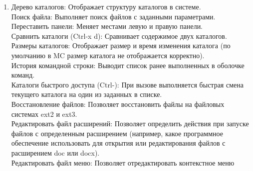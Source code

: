 \documentclass[
  english,
  russian,
  12pt,
  a4paper,
  DIV=11,
  numbers=noendperiod]{scrreprt}
\begin{document}
\begin{enumerate}
  Права доступа (Ctrl-x c): Позволяет указать (или изменить) права
  доступа к одному или нескольким файлам или каталогам.\\
  Жёсткая ссылка (Ctrl-x l): Создает жёсткую ссылку на текущий (или
  выделенный) файл.\\
  Символическая ссылка (Ctrl-x s): Создает символическую ссылку на
  текущий (или выделенный) файл.\\
  Владелец/группа (Ctrl-x o): Позволяет задать (или изменить) владельца
  и имя группы для одного или нескольких файлов или каталогов.\\
  Права (расширенные): Позволяет изменить расширенные права доступа и
  владение для одного или нескольких файлов или каталогов.\\
  Переименование (F6): Позволяет переименовать (или переместить) один
  или несколько файлов или каталогов.\\
  Создание каталога (F7): Позволяет создать новый каталог.\\
  Удалить (F8): Позволяет удалить один или несколько файлов или
  каталогов.\\
  Выход (F10): Завершает работу Midnight Commander (mc).
\item
  Дерево каталогов: Отображает структуру каталогов в системе.\\
  Поиск файла: Выполняет поиск файлов с заданными параметрами.\\
  Переставить панели: Меняет местами левую и правую панели.\\
  Сравнить каталоги (Ctrl-x d): Сравнивает содержимое двух каталогов.\\
  Размеры каталогов: Отображает размер и время изменения каталога (по
  умолчанию в MC размер каталога не отображается корректно).\\
  История командной строки: Выводит список ранее выполненных в оболочке
  команд.\\
  Каталоги быстрого доступа (Ctrl-): При вызове выполняется быстрая
  смена текущего каталога на один из заданных в списке.\\
  Восстановление файлов: Позволяет восстановить файлы на файловых
  системах ext2 и ext3.\\
  Редактировать файл расширений: Позволяет определить действия при
  запуске файлов с определенным расширением (например, какое программное
  обеспечение использовать для открытия или редактирования файлов с
  расширением doc или docx).\\
  Редактировать файл меню: Позволяет отредактировать контекстное меню

\end{enumerate}
\end{document}
